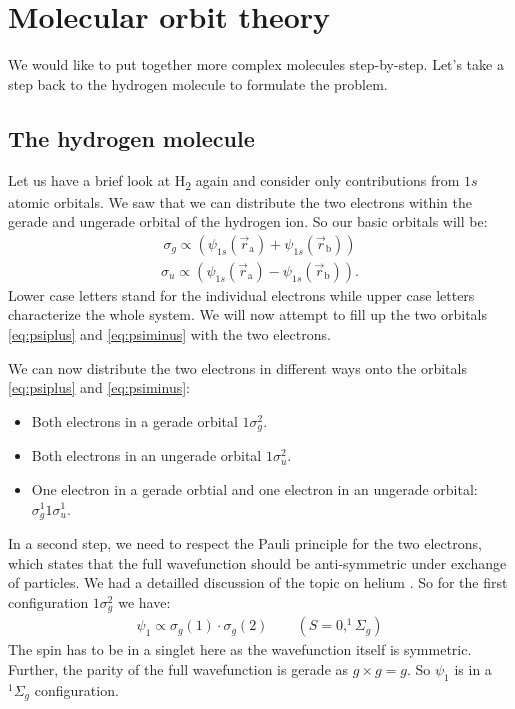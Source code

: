 \documentclass[10pt]{article}
\let\cite\citep
\providecommand\citep{\cite}
\begin{document}
\section{Molecular orbit theory}
We would like to put together more complex molecules step-by-step. Let's take a step back to the hydrogen molecule to formulate the problem.

\subsection{The hydrogen molecule}

 Let us have a brief look at H\textsubscript{2} again and consider only contributions from $1s$ atomic orbitals. We saw that we can distribute the two electrons within the gerade and ungerade orbital of the hydrogen ion. So our basic orbitals will be:
\begin{align}
\sigma_g \propto \left( \psi_{1s} (\vec{r}_\textrm{a}) + \psi_{1s} (\vec{r}_\textrm{b}) \right) \label{eq:psiplus}
\end{align}
\begin{align}
\sigma_u \propto \left( \psi_{1s} (\vec{r}_\textrm{a}) - \psi_{1s} (\vec{r}_\textrm{b}) \right). \label{eq:psiminus}
\end{align}
 Lower case letters stand for the individual electrons while upper case letters characterize the whole system. We will now attempt to fill up the two orbitals  \eqref{eq:psiplus} and \eqref{eq:psiminus} with the two electrons. 
 
We can now distribute the two electrons in different ways onto  the orbitals  \eqref{eq:psiplus} and \eqref{eq:psiminus}:
\begin{itemize}
\item Both electrons in a gerade orbital $1\sigma_g^{2}$.
\item Both electrons in an ungerade orbital $1\sigma_u^{2}$.
\item One electron in a gerade orbtial and one electron in an ungerade orbital: $\sigma_g^{1}1\sigma_u^{1}$.
\end{itemize}

In a second step, we need to respect the Pauli principle for the two electrons, which states that the full wavefunction should be anti-symmetric under exchange of particles. We had a detailled discussion of the topic on helium \cite{Jendrzejewskib}.
So for the first configuration $1\sigma_g^{2}$ we have:
\begin{align}
\psi_1 \propto \sigma_g(1) \cdot \sigma_g(2) \qquad (S=0, ^1\Sigma_g)
\end{align}
The spin has to be in a singlet here as the wavefunction itself is symmetric. Further, the parity of the full wavefunction is gerade as $g \times g = g$. So $\psi_1$ is in a $^1\Sigma_g$ configuration.
\end{document}
